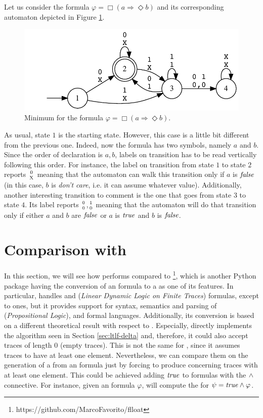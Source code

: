 \begin{example}
Let us consider the formula $\varphi = \Box (a \Rightarrow \Diamond b)$ and its corresponding automaton depicted in Figure \ref{fig:automa-example2}.
\begin{figure}[h]
\centering
\includegraphics{images/example2-output.eps}
\caption{Minimum \DFA for the formula $\varphi = \Box (a \Rightarrow \Diamond b)$.} 
\label{fig:automa-example2}
\end{figure}
As usual, state $1$ is the starting state. However, this case is a little bit different from the previous one. Indeed, now the formula has two symbols, namely $a$ and $b$. Since the order of declaration is $a,b$, labels on transition has to be read vertically following this order. For instance, the label on transition from state $1$ to state $2$ reports $0 \atop \text{X}$ meaning that the automaton can walk this transition only if $a$ is $\mathit{false}$ (in this case, $b$ is \emph{don't care}, i.e. it can assume whatever value). Additionally, another interesting transition to comment is the one that goes from state $3$ to state $4$. Its label reports $0 \atop 0$,$1 \atop 0$ meaning that the automaton will do that transition only if either $a$ and $b$ are $\mathit{false}$ or $a$ is $\mathit{true}$ and $b$ is $\mathit{false}$.
\end{example} 
\section{Comparison with \FLLOAT}\label{sec:flloat-comparison}
In this section, we will see how \LTLfToDFA performs compared to \href{https://pypi.org/project/flloat/}{\FLLOAT}\footnote{https://github.com/MarcoFavorito/flloat}, which is another Python package having the conversion of an \LTLf formula to a \DFA as one of its features.
In particular, \FLLOAT handles \LTLf and \LDLf (\textit{Linear Dynamic Logic on Finite Traces}) formulas, except to \PLTL ones, but it provides support for syntax, semantics and parsing of \PL (\textit{Propositional Logic}), \LTLf and \LDLf formal languages. Additionally, its conversion is based on a different theoretical result with respect to \LTLfToDFA. Especially, \FLLOAT directly implements the algorithm seen in Section \ref{sec:ltlf-delta} and, therefore, it could also accept traces of length $0$ (empty traces). This is not the same for \LTLfToDFA, since it assumes traces to have at least one element. Nevertheless, we can compare them on the generation of a \DFA from an \LTLf formula just by forcing \FLLOAT to produce \DFAs concerning traces with at least one element. This could be achieved adding $\mathit{true}$ to \FLLOAT formulas with the $\wedge$ connective. For instance, given an \LTLf formula $\varphi$, \FLLOAT will compute the \DFA for $\psi = \mathit{true} \wedge \varphi$.

